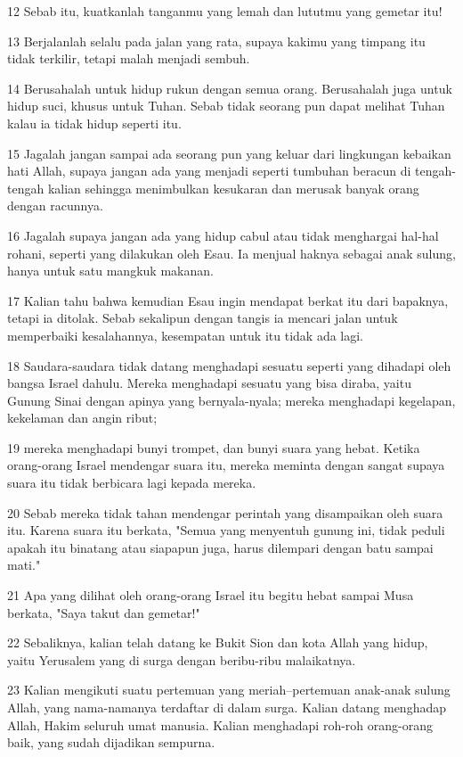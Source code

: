 \par 12 Sebab itu, kuatkanlah tanganmu yang lemah dan lututmu yang gemetar itu!
\par 13 Berjalanlah selalu pada jalan yang rata, supaya kakimu yang timpang itu tidak terkilir, tetapi malah menjadi sembuh.
\par 14 Berusahalah untuk hidup rukun dengan semua orang. Berusahalah juga untuk hidup suci, khusus untuk Tuhan. Sebab tidak seorang pun dapat melihat Tuhan kalau ia tidak hidup seperti itu.
\par 15 Jagalah jangan sampai ada seorang pun yang keluar dari lingkungan kebaikan hati Allah, supaya jangan ada yang menjadi seperti tumbuhan beracun di tengah-tengah kalian sehingga menimbulkan kesukaran dan merusak banyak orang dengan racunnya.
\par 16 Jagalah supaya jangan ada yang hidup cabul atau tidak menghargai hal-hal rohani, seperti yang dilakukan oleh Esau. Ia menjual haknya sebagai anak sulung, hanya untuk satu mangkuk makanan.
\par 17 Kalian tahu bahwa kemudian Esau ingin mendapat berkat itu dari bapaknya, tetapi ia ditolak. Sebab sekalipun dengan tangis ia mencari jalan untuk memperbaiki kesalahannya, kesempatan untuk itu tidak ada lagi.
\par 18 Saudara-saudara tidak datang menghadapi sesuatu seperti yang dihadapi oleh bangsa Israel dahulu. Mereka menghadapi sesuatu yang bisa diraba, yaitu Gunung Sinai dengan apinya yang bernyala-nyala; mereka menghadapi kegelapan, kekelaman dan angin ribut;
\par 19 mereka menghadapi bunyi trompet, dan bunyi suara yang hebat. Ketika orang-orang Israel mendengar suara itu, mereka meminta dengan sangat supaya suara itu tidak berbicara lagi kepada mereka.
\par 20 Sebab mereka tidak tahan mendengar perintah yang disampaikan oleh suara itu. Karena suara itu berkata, "Semua yang menyentuh gunung ini, tidak peduli apakah itu binatang atau siapapun juga, harus dilempari dengan batu sampai mati."
\par 21 Apa yang dilihat oleh orang-orang Israel itu begitu hebat sampai Musa berkata, "Saya takut dan gemetar!"
\par 22 Sebaliknya, kalian telah datang ke Bukit Sion dan kota Allah yang hidup, yaitu Yerusalem yang di surga dengan beribu-ribu malaikatnya.
\par 23 Kalian mengikuti suatu pertemuan yang meriah--pertemuan anak-anak sulung Allah, yang nama-namanya terdaftar di dalam surga. Kalian datang menghadap Allah, Hakim seluruh umat manusia. Kalian menghadapi roh-roh orang-orang baik, yang sudah dijadikan sempurna.

